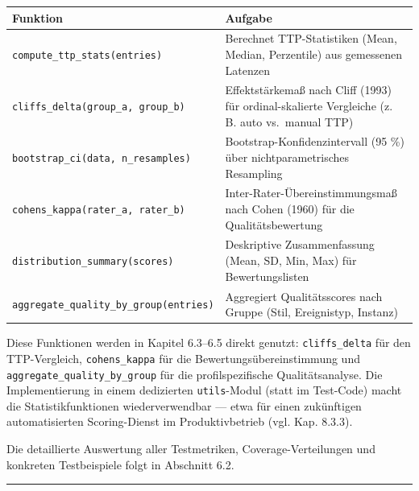 {\def\LTcaptype{none} %
\begin{longtable}[]{@{}
  >{\raggedright\arraybackslash}p{}
  >{\raggedright\arraybackslash}p{}@{}}
\toprule\noalign{}
\begin{minipage}[b]{\linewidth}\raggedright
Funktion
\end{minipage} & \begin{minipage}[b]{\linewidth}\raggedright
Aufgabe
\end{minipage} \\
\midrule\noalign{}
\endhead
\bottomrule\noalign{}
\endlastfoot
\texttt{compute\_ttp\_stats(entries)} & Berechnet TTP-Statistiken (Mean,
Median, Perzentile) aus gemessenen Latenzen \\
\texttt{cliffs\_delta(group\_a,\ group\_b)} & Effektstärkemaß nach Cliff
(1993) für ordinal-skalierte Vergleiche (z. B. auto vs.~manual TTP) \\
\texttt{bootstrap\_ci(data,\ n\_resamples)} &
Bootstrap-Konfidenzintervall (95 \%) über nichtparametrisches
Resampling \\
\texttt{cohens\_kappa(rater\_a,\ rater\_b)} &
Inter-Rater-Übereinstimmungsmaß nach Cohen (1960) für die
Qualitätsbewertung \\
\texttt{distribution\_summary(scores)} & Deskriptive Zusammenfassung
(Mean, SD, Min, Max) für Bewertungslisten \\
\texttt{aggregate\_quality\_by\_group(entries)} & Aggregiert
Qualitätsscores nach Gruppe (Stil, Ereignistyp, Instanz) \\
\end{longtable}
}

Diese Funktionen werden in Kapitel 6.3--6.5 direkt genutzt:
\texttt{cliffs\_delta} für den TTP-Vergleich, \texttt{cohens\_kappa} für
die Bewertungsübereinstimmung und \texttt{aggregate\_quality\_by\_group}
für die profilspezifische Qualitätsanalyse. Die Implementierung in einem
dedizierten \texttt{utils}-Modul (statt im Test-Code) macht die
Statistikfunktionen wiederverwendbar --- etwa für einen zukünftigen
automatisierten Scoring-Dienst im Produktivbetrieb (vgl. Kap. 8.3.3).

Die detaillierte Auswertung aller Testmetriken, Coverage-Verteilungen
und konkreten Testbeispiele folgt in Abschnitt 6.2.

\begin{center}\rule{0.5\linewidth}{0.5pt}\end{center}

